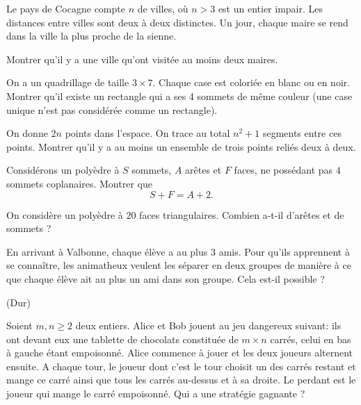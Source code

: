 \begin{exo}
Le pays de Cocagne compte $n$ de villes, où $n > 3$ est un entier impair. Les distances entre villes sont deux à deux distinctes. Un jour, chaque maire se rend dans la ville la plus proche de la sienne. 

Montrer qu’il y a une ville qu’ont visitée au moins deux maires.
\end{exo}

\begin{exo}
On a un quadrillage de taille $3 \times 7$. Chaque case est coloriée en blanc ou en noir. Montrer qu'il existe un rectangle qui a ses 4 sommets de même couleur (une case unique n'est pas considérée comme un rectangle).
\end{exo}

\begin{exo}
On donne $2n$ points dans l'espace. On trace au total $n^2+1$ segments entre ces points. Montrer qu'il y a au moins un ensemble de trois points reliés deux à deux.
\end{exo}

\begin{exo}
Considérons un polyèdre à $S$ sommets, $A$ arêtes et $F$ faces, ne possédant pas $4$ sommets coplanaires. Montrer que
$$S+F = A+2.$$
\end{exo}

\begin{exo}
On considère un polyèdre à $20$ faces triangulaires. Combien a-t-il d'arêtes et de sommets ?
\end{exo}

\begin{exo}
En arrivant à Valbonne, chaque élève a au plus 3 amis. Pour qu'ils apprennent à se connaître, les animatheux veulent les séparer en deux groupes de manière à ce que chaque élève ait au plus un ami dans son groupe. Cela est-il possible ?
\end{exo}

\begin{exo}
(Dur)

Soient $m,n\ge 2$ deux entiers. Alice et Bob jouent au jeu dangereux suivant: ils ont devant eux une tablette de chocolats constituée de $m\times n$ carrés, celui en bas à gauche étant empoisonné. Alice commence à jouer et les deux joueurs alternent ensuite. A chaque tour, le joueur dont c'est le tour choisit un des carrés restant et mange ce carré ainsi que tous les carrés au-dessus et à sa droite. Le perdant est le joueur qui mange le carré empoisonné. Qui a une stratégie gagnante ?
\end{exo}

